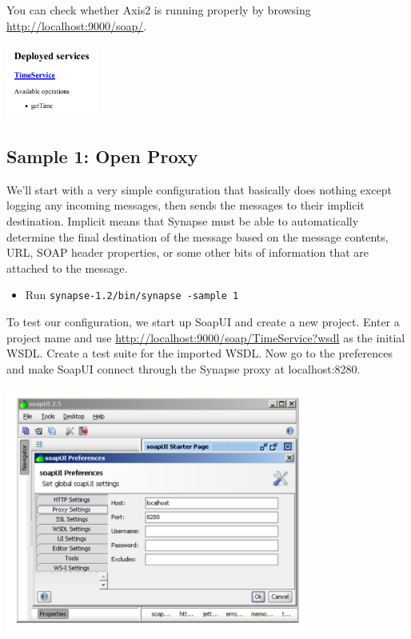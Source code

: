 You can check whether Axis2 is running properly by browsing
\url{http://localhost:9000/soap/}.
\begin{center}
\includegraphics[width=3cm]{figures/axis2-success.pdf}
\end{center}

\subsection{Sample 1: Open Proxy}
\label{sec:sample-1}
We'll start with a very simple configuration that basically does nothing except
logging any incoming messages, then sends the messages to their implicit
destination. Implicit means that Synapse must be able to automatically
determine the final destination of the message based on the message contents,
URL, SOAP header properties, or some other bits of information that are attached to
the message.
\begin{itemize}
  \item Run \texttt{synapse-1.2/bin/synapse -sample 1}
\end{itemize}

\lstset{caption=, label=sample-1-xml}


To test our configuration, we start up SoapUI and create a new project. Enter a
project name and use \url{http://localhost:9000/soap/TimeService?wsdl} as the
initial WSDL. Create a test suite for the imported WSDL. Now go to the
preferences and make SoapUI connect through the Synapse proxy at localhost:8280.

\begin{center}
\includegraphics[width=10cm]{figures/soapui-proxy.pdf}
\end{center}

